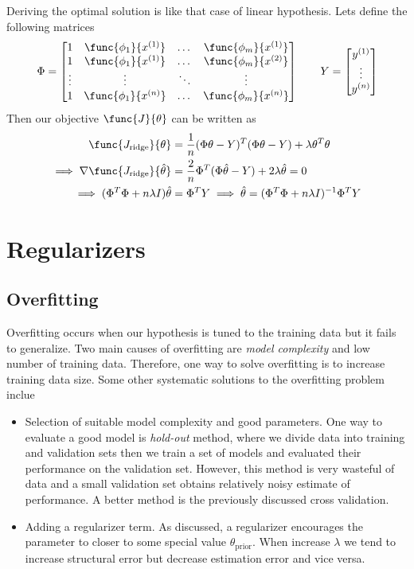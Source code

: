 Deriving the optimal solution is like that case of linear hypothesis. Lets define the following matrices 
\begin{equation*}
    \Phi = \begin{bmatrix}
        1 & \func{\phi_1}{x^{(1)}} & \dots & \func{\phi_m}{x^{(1)}} \\
        1 & \func{\phi_1}{x^{(1)}}  & \dots & \func{\phi_m}{x^{(2)}} \\
        \vdots& \vdots & \ddots & \vdots\\
        1 & \func{\phi_1}{x^{(n)}}  & \dots & \func{\phi_m}{x^{(n)}} \\

    \end{bmatrix} \qquad Y = \begin{bmatrix}
        y^{(1)}\\
        \vdots \\
        y^{(n)} 
    \end{bmatrix} 
\end{equation*}
Then our objective \(\func{J}{\theta}\) can be written as 
\begin{align*}
    \func{J_{\mathrm{ridge}}}{\theta} &= \frac{1}{n} (\Phi\theta - Y)^T (\Phi\theta-Y) + \lambda \theta^T \theta \\
     \implies \nabla \func{J_{\mathrm{ridge}}}{\hat{\theta}} &= \dfrac{2}{n} \Phi^T (\Phi\hat{\theta} - Y) + 2\lambda \hat{\theta}  = 0\\ 
     \implies  (\Phi^T\Phi + n \lambda I) \hat{\theta} &= \Phi^T Y \implies \hat{\theta}  = (\Phi^T\Phi + n \lambda I )^{-1} \Phi^T Y
\end{align*}
\section{Regularizers}
\subsection{Overfitting}
Overfitting occurs when our hypothesis is tuned to the training data but it fails to generalize. Two main causes of overfitting are \textit{model complexity} and low number of training data. Therefore, one way to solve overfitting is to increase training data size. Some other systematic solutions to the overfitting problem inclue 
\begin{itemize}
    \item Selection of suitable model complexity and good parameters. One way to  evaluate a good model is \textit{hold-out} method, where we divide data into training and validation sets then we train a set of models and evaluated their performance on the validation set. However, this method is very wasteful of data and a small validation set obtains relatively noisy estimate of performance. A better method is the previously discussed cross validation.
    \item Adding a regularizer term. As discussed, a regularizer encourages the parameter to closer to some special value \(\theta_{\mathrm{prior}}\). When increase \(\lambda\) we tend to increase structural error but decrease estimation error and vice versa.
\end{itemize}
